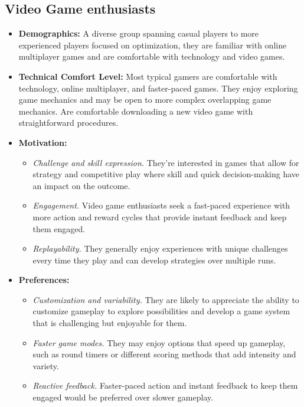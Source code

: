 \subsection{Video Game enthusiasts}

\begin{itemize}
	\item \textbf{Demographics:} A diverse group spanning casual players to more experienced players focused on optimization, they are familiar with online multiplayer games and are comfortable with technology and video games.
	\item \textbf{Technical Comfort Level:} Most typical gamers are comfortable with technology, online multiplayer, and faster-paced games. They enjoy exploring game mechanics and may be open to more complex overlapping game mechanics. Are comfortable downloading a new video game with straightforward procedures.
	\item \textbf{Motivation:}
	\begin{itemize}
		\item \textit{Challenge and skill expression.} They're interested in games that allow for strategy and competitive play where skill and quick decision-making have an impact on the outcome.
		\item \textit{Engagement.} Video game enthusiasts seek a fast-paced experience with more action and reward cycles that provide instant feedback and keep them engaged.
		\item \textit{Replayability.} They generally enjoy experiences with unique challenges every time they play and can develop strategies over multiple runs.
	\end{itemize}
	\item \textbf{Preferences:}
	\begin{itemize}
		\item \textit{Customization and variability.} They are likely to appreciate the ability to customize gameplay to explore possibilities and develop a game system that is challenging but enjoyable for them.
		\item \textit{Faster game modes.} They may enjoy options that speed up gameplay, such as round timers or different scoring methods that add intensity and variety.
		\item \textit{Reactive feedback.} Faster-paced action and instant feedback to keep them engaged would be preferred over slower gameplay.
	\end{itemize}
\end{itemize}

